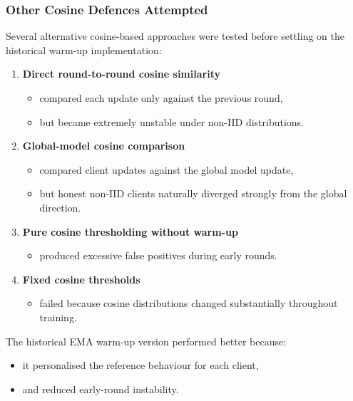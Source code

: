 \subsubsection*{Other Cosine Defences Attempted}

Several alternative cosine-based approaches were tested before settling on the historical warm-up implementation:

\begin{enumerate}
    \item \textbf{Direct round-to-round cosine similarity}
    \begin{itemize}
        \item compared each update only against the previous round,
        \item but became extremely unstable under non-IID distributions.
    \end{itemize}

    \item \textbf{Global-model cosine comparison}
    \begin{itemize}
        \item compared client updates against the global model update,
        \item but honest non-IID clients naturally diverged strongly from the global direction.
    \end{itemize}

    \item \textbf{Pure cosine thresholding without warm-up}
    \begin{itemize}
        \item produced excessive false positives during early rounds.
    \end{itemize}

    \item \textbf{Fixed cosine thresholds}
    \begin{itemize}
        \item failed because cosine distributions changed substantially throughout training.
    \end{itemize}
\end{enumerate}

The historical EMA warm-up version performed better because:
\begin{itemize}
    \item it personalised the reference behaviour for each client,
    \item and reduced early-round instability.
\end{itemize}

